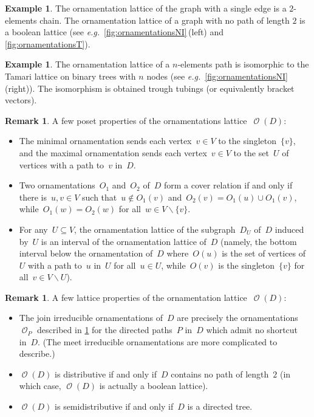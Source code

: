 \documentclass{amsart}
\theoremstyle{definition}
\newtheorem{example}[theorem]{Example}
\newtheorem{remark}[theorem]{Remark}
\renewcommand{\c}[1]{\mathcal{#1}} %
\newcommand{\ssm}{\smallsetminus} %
\newcommand{\eg}{\textit{e.g.}~} %
\DeclareMathOperator{\Orn}{\c{O}}  %
\begin{document}
\begin{example}
The ornamentation lattice of the graph with a single edge is a $2$-elements chain.
The ornamentation lattice of a graph with no path of length $2$ is a boolean lattice (see \eg \cref{fig:ornamentationsNI}\,(left) and \cref{fig:ornamentationsT}).
\end{example}

\begin{example}
The ornamentation lattice of a $n$-elements path is isomorphic to the Tamari lattice on binary trees with $n$ nodes (see \eg \cref{fig:ornamentationsNI}\,(right)).
The isomorphism is obtained trough tubings (or equivalently bracket vectors).
\end{example}

\begin{remark}
\label{rem:posetPropertiesOrnamentations}
A few poset properties of the ornamentations lattice~$\Orn(D)$:
\begin{itemize}
\item The minimal ornamentation sends each vertex~$v \in V$ to the singleton~$\{v\}$, and the maximal ornamentation sends each vertex~$v \in V$ to the set~$U$ of vertices with a path to~$v$ in~$D$.
\item Two ornamentations~$O_1$ and~$O_2$ of~$D$ form a cover relation if and only if there is~$u, v \in V$ such that~$u \notin O_1(v)$ and~$O_2(v) = O_1(u) \cup O_1(v)$, while~$O_1(w) = O_2(w)$ for all~$w \in V \ssm \{v\}$.
\item For any~$U \subseteq V$, the ornamentation lattice of the subgraph~$D_U$ of~$D$ induced by~$U$ is an interval of the ornamentation lattice of~$D$ (namely, the bottom interval below the ornamentation of~$D$ where~$O(u)$ is the set of vertices of~$U$ with a path to~$u$ in~$U$ for all~$u \in U$, while~$O(v)$ is the singleton~$\{v\}$ for all~$v \in V \ssm U$).
\end{itemize}
\end{remark}

\begin{remark}
A few lattice properties of the ornamentation lattice~$\Orn(D)$:
\begin{itemize}
\item The join irreducible ornamentations of~$D$ are precisely the ornamentations~$\Orn_P$ described in \cref{rem:posetPropertiesOrnamentations} for the directed paths~$P$ in~$D$ which admit no shortcut in~$D$. (The meet irreducible ornamentations are more complicated to describe.)
\item $\Orn(D)$ is distributive if and only if~$D$ contains no path of length~$2$ (in which case, $\Orn(D)$ is actually a boolean lattice).
\item $\Orn(D)$ is semidistributive if and only if~$D$ is a directed tree.
\end{itemize}
\end{remark}
\end{document}
